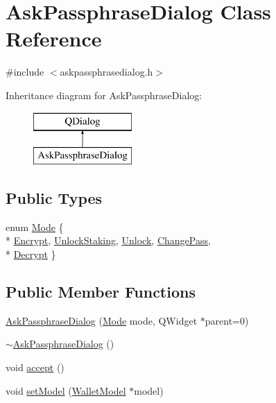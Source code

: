\hypertarget{class_ask_passphrase_dialog}{}\section{Ask\+Passphrase\+Dialog Class Reference}
\label{class_ask_passphrase_dialog}


{\ttfamily \#include $<$askpassphrasedialog.\+h$>$}

Inheritance diagram for Ask\+Passphrase\+Dialog\+:\begin{figure}[H]
\begin{center}
\leavevmode
\includegraphics[height=2.000000cm]{class_ask_passphrase_dialog}
\end{center}
\end{figure}
\subsection*{Public Types}
\begin{DoxyCompactItemize}
\item 
enum \hyperlink{class_ask_passphrase_dialog_a96abf4d3c36c1ef9e268fb546ae76538}{Mode} \{ \\*
\hyperlink{class_ask_passphrase_dialog_a96abf4d3c36c1ef9e268fb546ae76538a5894886141cada548b21488927acc467}{Encrypt}, 
\hyperlink{class_ask_passphrase_dialog_a96abf4d3c36c1ef9e268fb546ae76538a913cd3fda90d33b397ebf191365ecc91}{Unlock\+Staking}, 
\hyperlink{class_ask_passphrase_dialog_a96abf4d3c36c1ef9e268fb546ae76538a2af79cac6134924405d6c620fb0f4c7e}{Unlock}, 
\hyperlink{class_ask_passphrase_dialog_a96abf4d3c36c1ef9e268fb546ae76538abc3f96ab0f90c0a3b0606407b4f662cc}{Change\+Pass}, 
\\*
\hyperlink{class_ask_passphrase_dialog_a96abf4d3c36c1ef9e268fb546ae76538aac5e2489527af224fc5e1316a77ba478}{Decrypt}
 \}
\end{DoxyCompactItemize}
\subsection*{Public Member Functions}
\begin{DoxyCompactItemize}
\item 
\hyperlink{class_ask_passphrase_dialog_a5bf3d4d81d7dbe15bee48f7ca2ee42b2}{Ask\+Passphrase\+Dialog} (\hyperlink{class_ask_passphrase_dialog_a96abf4d3c36c1ef9e268fb546ae76538}{Mode} mode, Q\+Widget $\ast$parent=0)
\item 
\hyperlink{class_ask_passphrase_dialog_ab5f923af5131db88c6a44a15559b461c}{$\sim$\+Ask\+Passphrase\+Dialog} ()
\item 
void \hyperlink{class_ask_passphrase_dialog_ac2f176af3693b73870d26ef0bfc6cbb9}{accept} ()
\item 
void \hyperlink{class_ask_passphrase_dialog_a35b83e1ef98813b6b88155aab0803ed3}{set\+Model} (\hyperlink{class_wallet_model}{Wallet\+Model} $\ast$model)
\end{DoxyCompactItemize}
